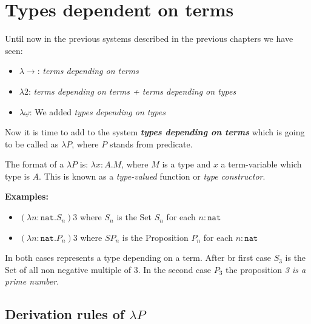 \documentclass[12pt, a4paper]{article}
\begin{document}
\section{Types dependent on terms}
Until now in the previous systems described in the previous chapters we have seen:

\begin{itemize}
    \item $\lambda \to$: \textit{terms depending on terms}
    \item $\lambda 2$: \textit{terms depending on terms + terms depending on types}
    \item $\lambda\underline{\omega}$: We added \textit{types depending on types}
\end{itemize}

Now it is time to add to the system \textbf{\textit{types depending on terms}} which is going to be called as $\lambda P$, where $P$ stands from predicate.

The format of a $\lambda P$ is: $\lambda x : A . M$, where $M$ is a type and $x$ a term-variable which type is $A$. This is known as 
a \textit{type-valued} function or \textit{type constructor}.

\textbf{Examples:}

\begin{itemize}
    \item $(\lambda n : \mathtt{nat} . S_n)3$ where $S_n$ is the Set $S_n$ for each $n : \mathtt{nat}$
    \item $(\lambda n : \mathtt{nat} . P_n)3$ where $SP_n$ is the Proposition $P_n$ for each $n : \mathtt{nat}$
\end{itemize}

In both cases represents a type depending on a term. After \acrshort{br} first case $S_3$ is the Set of all non negative multiple of $3$. 
In the second case $P_3$ the proposition \textit{3 is a prime number}.

\subsection{Derivation rules of \texorpdfstring{$\lambda P$}{}}
\end{document}
